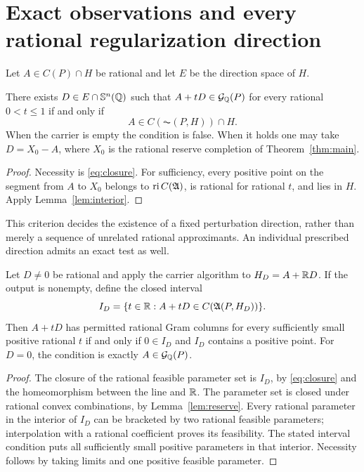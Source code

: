 \section{Exact observations and every rational regularization direction}\label{sec:directions}
Let $A\in C(P)\cap H$ be rational and let $E$ be the direction space of $H$.

\begin{theorem}\label{thm:regularize}
There exists $D\in E\cap\mathbb S^n(\mathbb Q)$ such that $A+tD\in\mathcal G_{\mathbb Q}(P)$ for every rational $0<t\le1$ if and only if
\[
 A\in C(\AC(P,H))\cap H.
\]
When the carrier is empty the condition is false. When it holds one may take $D=X_0-A$, where $X_0$ is the rational reserve completion of Theorem~\ref{thm:main}.
\end{theorem}
\begin{proof}
Necessity is \eqref{eq:closure}. For sufficiency, every positive point on the segment from $A$ to $X_0$ belongs to $\operatorname{ri} C(\mathfrak A)$, is rational for rational $t$, and lies in $H$. Apply Lemma~\ref{lem:interior}.
\end{proof}

This criterion decides the existence of a fixed perturbation direction, rather than merely a sequence of unrelated rational approximants. An individual prescribed direction admits an exact test as well.

\begin{theorem}\label{thm:individual}
Let $D\ne0$ be rational and apply the carrier algorithm to $H_D=A+\mathbb R D$. If the output is nonempty, define the closed interval
\[
 I_D=\{t\in\mathbb R:A+tD\in C(\mathfrak A(P,H_D))\}.
\]
Then $A+tD$ has permitted rational Gram columns for every sufficiently small positive rational $t$ if and only if $0\in I_D$ and $I_D$ contains a positive point. For $D=0$, the condition is exactly $A\in\mathcal G_{\mathbb Q}(P)$.
\end{theorem}
\begin{proof}
The closure of the rational feasible parameter set is $I_D$, by \eqref{eq:closure} and the homeomorphism between the line and $\mathbb R$. The parameter set is closed under rational convex combinations, by Lemma~\ref{lem:reserve}. Every rational parameter in the interior of $I_D$ can be bracketed by two rational feasible parameters; interpolation with a rational coefficient proves its feasibility. The stated interval condition puts all sufficiently small positive parameters in that interior. Necessity follows by taking limits and one positive feasible parameter.
\end{proof}

